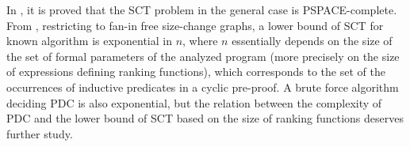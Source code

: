 In \cite{Lee1}, it is proved that the SCT problem in the general case is PSPACE-complete. 
From  \cite{Lee3}, restricting to fan-in free size-change graphs, a lower bound of SCT
for known algorithm is exponential in $n$, where $n$ essentially depends on the size of the set of formal parameters of the analyzed program (more precisely on the size of expressions defining ranking functions), which corresponds to the set of the occurrences of inductive predicates in a cyclic pre-proof. A brute force algorithm deciding PDC is also exponential, but the relation between the complexity of PDC and the lower bound of SCT based on the size of ranking functions 
deserves further study.

